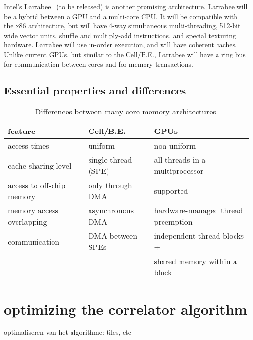\documentclass{article}
\begin{document}
Intel's Larrabee~\cite{larrabee} (to be released) is another promising
architecture.  Larrabee will be a hybrid between a GPU and a
multi-core CPU.  It will be compatible with the x86 architecture, but
will have 4-way simultaneous multi-threading, 512-bit wide vector
units, shuffle and multiply-add instructions, and special texturing
hardware. Larrabee will use in-order execution, and will have coherent
caches.  Unlike current GPUs, but similar to the \mbox{Cell/B.E.},
Larrabee will have a ring bus for communication between cores and for 
memory transactions.

\subsection{Essential properties and differences}

\begin{table*}[t]
\begin{center}
{\small
\begin{tabular}{l|l|l}
feature                   & Cell/B.E.                      & GPUs \\
\hline
access times              & uniform                        & non-uniform \\
cache sharing level       & single thread (SPE)            & all threads in a multiprocessor \\
access to off-chip memory & only through DMA               & supported \\
memory access overlapping & asynchronous DMA               & hardware-managed thread preemption \\
communication             & DMA between SPEs               & independent thread blocks + \\
                          &                                & shared memory within a block \\
\end{tabular}
} %
\end{center}
\vspace{-0.5cm}
\caption{Differences between many-core memory architectures.}
\label{memory-properties}
\end{table*}


\section {optimizing the correlator algorithm}
\- optimaliseren van het algorithme: tiles, etc
\end{document}
